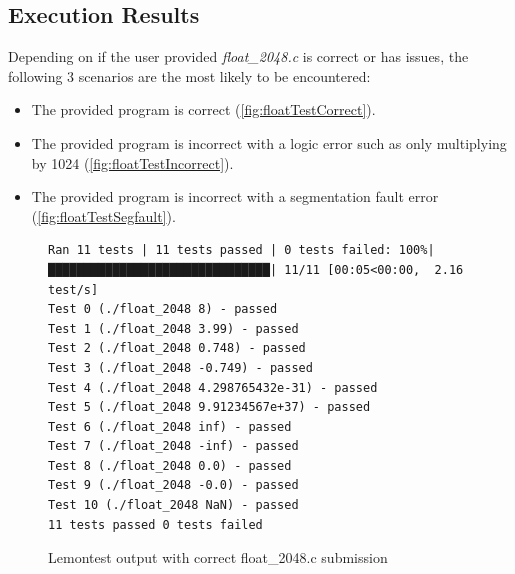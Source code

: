 \documentclass[hidelinks]{report}
\begin{document}
\subsection{Execution Results}\label{lemontestResults}
Depending on if the user provided \textit{float\_2048.c} is correct or has issues, the following 3 scenarios are the most likely to be encountered:
\begin{itemize}
	\item The provided program is correct (\autoref{fig:floatTestCorrect}).
	\item The provided program is incorrect with a logic error such as only multiplying by 1024 (\autoref{fig:floatTestIncorrect}).
	\item The provided program is incorrect with a segmentation fault error (\autoref{fig:floatTestSegfault}).
\end{itemize}
\begin{figure}[h]
	\centering
	\begin{lstlisting}[breaklines=true, linewidth=\linewidth, tabsize=4]
Ran 11 tests | 11 tests passed | 0 tests failed: 100%|███████████████████████████████| 11/11 [00:05<00:00,  2.16 test/s]
Test 0 (./float_2048 8) - passed
Test 1 (./float_2048 3.99) - passed
Test 2 (./float_2048 0.748) - passed
Test 3 (./float_2048 -0.749) - passed
Test 4 (./float_2048 4.298765432e-31) - passed
Test 5 (./float_2048 9.91234567e+37) - passed
Test 6 (./float_2048 inf) - passed
Test 7 (./float_2048 -inf) - passed
Test 8 (./float_2048 0.0) - passed
Test 9 (./float_2048 -0.0) - passed
Test 10 (./float_2048 NaN) - passed
11 tests passed 0 tests failed
	\end{lstlisting}
	\caption{Lemontest output with correct float\_2048.c submission}
	\label{fig:floatTestCorrect}
\end{figure}
\end{document}
